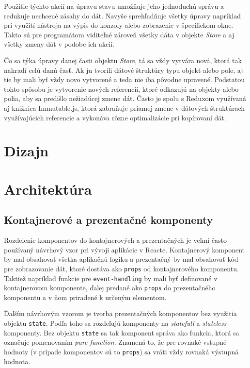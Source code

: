 \documentclass[
  digital, %
  table,   %
  lof,     %
  lot,     %
]{fithesis3}
\begin{document}
Použitie týchto akcií na úpravu stavu umožňuje jeho jednoduchú správu a redukuje nechcené zásahy do dát. Navyše sprehľadňuje všetky úpravy napríklad pri využití nástroja na výpis do konzoly alebo zobrazenie v špecifickom okne. Takto sú pre programátora viditeľné zároveň všetky dáta v objekte \textit{Store} a aj všetky zmeny dát v podobe ich akcií.

Čo sa týka úpravy danej časti objektu \textit{Store}, tá sa vždy vytvára nová, ktorá tak nahradí celú danú časť. Ak ju tvorili dátové štruktúry typu objekt alebo pole, aj tie by mali byť vždy novo vytvorené a teda nie iba pôvodne upravené. Podstatou tohto spôsobu je vytvorenie nových referencií, ktoré odkazujú na objekty alebo polia, aby sa predišlo nežiadúcej zmene dát. Často je spolu s Reduxom využívaná aj knižnica Immutable.js, ktorá zabraňuje priamej zmene v dátových štruktúrach využívajúcich referencie a vykonáva rôzne optimalizácie pri kopírovaní dát.

\section{Dizajn}

\section{Architektúra}
\subsection{Kontajnerové a prezentačné komponenty}
Rozdelenie komponentov do kontajnerových a prezentačných je veľmi často používaný návrhový vzor pri vývoji aplikácie v Reacte. Kontajnerový komponent by mal obsahovať všetka aplikačnú logiku a prezentačný by mal obsahovať kód pre zobrazovanie dát, ktoré dostáva ako \texttt{props} od kontajnerového komponentu. Taktiež napríklad funkcie pre \texttt{event-handling} by mali byť definované v kontajnerovom komponente, ďalej predané ako \texttt{props} do prezentačného komponentu a v ňom priradené k určeným elementom.

Ďalším návrhovým vzorom je tvorba prezentačných komponentov bez využitia objektu \texttt{state}. Podľa toho sa rozdeľujú komponenty na \textit{statefull} a \textit{stateless} komponenty. Bez objektu \texttt{state} sa tak komponent správa ako funkcia, ktorá sa označuje pomenovaním \textit{pure function}. Znamená to, že pre rovnaké vstupné hodnoty (v prípade komponentov sú to \texttt{props}) sa vráti vždy rovnaká výstupná hodnota.
\end{document}

